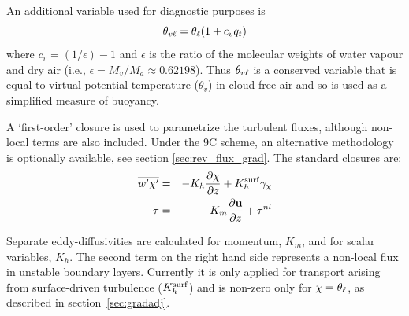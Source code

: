 \documentclass{UMDP_article}
\begin{document}
An additional variable used for diagnostic purposes is 
\begin{equation}
  \theta_{v\ell} = \theta_{\ell} (1 + c_v q_t)
  \label{thetavl}
\end{equation}
where $c_v=(1/\epsilon) -1$ and $\epsilon$ is the ratio of the
molecular weights of water vapour and dry air (\mbox{i.e.}, $\epsilon
= M_v/M_a \approx 0.62198$).  Thus $\theta_{v\ell}$ is a conserved variable
that is equal to virtual potential temperature ($\theta_v$) in
cloud-free air and so is used as a simplified measure of buoyancy.
 
A `first-order' closure is used to parametrize the turbulent fluxes,
although non-local terms are also included.  Under the 9C scheme, an
alternative methodology is optionally available, see section
\ref{sec:rev_flux_grad}.  The standard closures are:
\begin{eqnarray}
  \overline{w'\chi'} &=& - K_h \frac{\partial \chi}{\partial z} + K_h^{\rm surf} \gamma_{\chi} 
  \label{scal_closure} \\
  {\bf \tau} &=& K_m \frac{\partial {\bf u}}{\partial z} + {\bf \tau}^{nl}
  \label{uv_closure}
\end{eqnarray}

Separate eddy-diffusivities are calculated for momentum, $K_m$, and
for scalar variables, $K_h$.  The second term on the right hand side
represents a non-local flux in unstable boundary layers. Currently it
is only applied for transport arising from surface-driven turbulence
($K_h^{\rm surf}$) and is non-zero only for $\chi=\theta_{\ell}$, as described in
section~\ref{sec:gradadj}.
\end{document}
